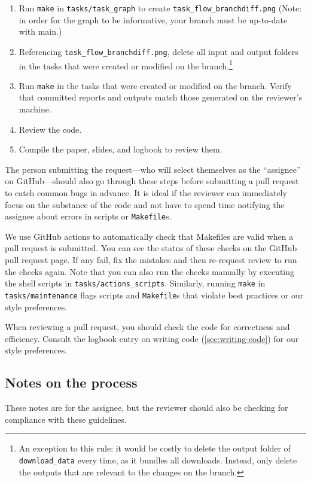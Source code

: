 \begin{enumerate}
\item Run \texttt{make} in \texttt{tasks/task\_graph} to create \texttt{task\_flow\_branchdiff.png}
    (Note: in order for the graph to be informative, your branch must be up-to-date with main.)
\item Referencing \texttt{task\_flow\_branchdiff.png},
    delete all input and output folders in the tasks that were created or
    modified on the branch.\footnote{An exception to this rule:
    it would be costly to delete the output folder of \texttt{download\_data} every time,
    as it bundles all downloads. Instead, only delete the outputs that are relevant to the changes
    on the branch.}
\item Run \texttt{make} in the tasks that were created or modified on the branch.
Verify that committed reports and outputs match those generated on the reviewer's machine.
\item Review the code.
\item Compile the paper, slides, and logbook to review them.
\end{enumerate}

The person submitting the request---who
will select themselves as the ``assignee'' on GitHub---should
also go through these steps before submitting a pull request
to catch common bugs in advance.
It is ideal if the reviewer can immediately focus on the substance of the code
and not have to spend time notifying the assignee about errors in scripts or \texttt{Makefile}s.

We use GitHub actions to automatically check
that Makefiles are valid when a pull request is submitted.
You can see the status of these checks on the GitHub pull request page.
If any fail,
fix the mistakes and then re-request review to run the checks again.
Note that you can also run the checks manually by executing the shell
scripts in \texttt{tasks/actions\_scripts}.
Similarly, running \texttt{make} in \texttt{tasks/maintenance} flags scripts and \texttt{Makefile}s that
violate best practices or our style preferences.

When reviewing a pull request,
you should check the code for correctness and efficiency.
Consult the logbook entry on writing code (\ref{sec:writing-code}) for our style preferences.

\subsection{Notes on the process}
These notes are for the assignee,
but the reviewer should also be checking for compliance with these guidelines.

